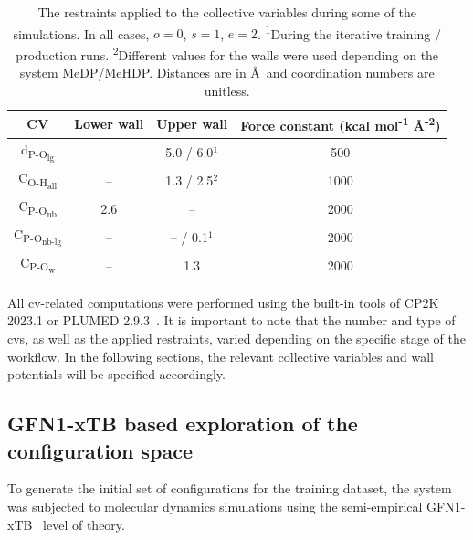 \begin{table}[b!]
    \centering
    \caption{The restraints applied to the collective variables during some of the simulations. In all cases, $o = 0$, $s = 1$, $e = 2$. \textsuperscript{1}During the iterative training / production runs. \textsuperscript{2}Different values for the walls were used depending on the system MeDP/MeHDP. Distances are in \AA\ and coordination numbers are unitless.}
    \label{tab:wall_potentials}
    \begin{tabular}{cccc}
    \toprule
    \textbf{CV} & \textbf{Lower wall} & \textbf{Upper wall} & \textbf{Force constant (kcal mol\textsuperscript{-1} \AA\textsuperscript{-2})} \\
    \midrule
    d\textsubscript{P-O\textsubscript{lg}} & -- & 5.0 / 6.0$^{1}$ & 500  \\
    C\textsubscript{O-H\textsubscript{all}} & -- & 1.3 / 2.5$^{2}$ & 1000 \\
    C\textsubscript{P-O\textsubscript{nb}} & 2.6 & -- & 2000 \\
    C\textsubscript{P-O\textsubscript{nb-lg}} & -- & -- / 0.1$^{1}$ & 2000 \\
    C\textsubscript{P-O\textsubscript{w}} & -- & 1.3 & 2000 \\
    \bottomrule
    \end{tabular}
\end{table}

All \ac{cv}-related computations were performed using the built-in tools of CP2K 2023.1 \citep{kuhneCP2KElectronicStructure2020} or PLUMED 2.9.3~\citep{tribelloPLUMED2New2014}. It is important to note that the number and type of \acp{cv}, as well as the applied restraints, varied depending on the specific stage of the workflow. In the following sections, the relevant collective variables and wall potentials will be specified accordingly.



\subsection{GFN1-xTB based exploration of the configuration space}
\label{subsec:xtb-exploration-of-configuration-space}
To generate the initial set of configurations for the training dataset, the system was subjected to molecular dynamics simulations using the semi-empirical GFN1-xTB~\citep{grimmeRobustAccurateTightBinding2017} level of theory. 

